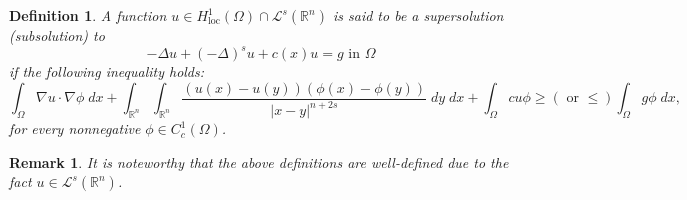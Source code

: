 \documentclass[11pt, notitlepage]{article}
\def\R{\mathbb{R}}
\newtheorem{Remark}[Theorem]{Remark}
\newtheorem{Definition}[Theorem]{Definition}
\begin{document}
{\begin{Definition}
    A function $u\in H^1_{\mathrm{loc}}(\Omega)\cap\mathcal{L}^s(\R^n)$ is said to be a supersolution (subsolution) to $$-\Delta u+(-\Delta)^su+c(x)u=g\text{ in }\Omega$$ if the following inequality holds:
$$\int_\Omega \nabla u\cdot\nabla\phi\;dx+\int_{\R^n}\int_{\R^n}\frac{(u(x)-u(y))(\phi(x)-\phi(y))}{|x-y|^{n+2s}}\;dy\;dx+\int_\Omega cu\phi\geq (\text{ or } \leq)\int_\Omega g\phi\;dx,$$
    for every nonnegative $\phi\in C^1_c(\Omega)$.
\end{Definition}
\begin{Remark}
It is noteworthy that the above definitions are well-defined due to the fact $u\in\mathcal{L}^s(\R^n)$.
\end{Remark}
}
\end{document}
